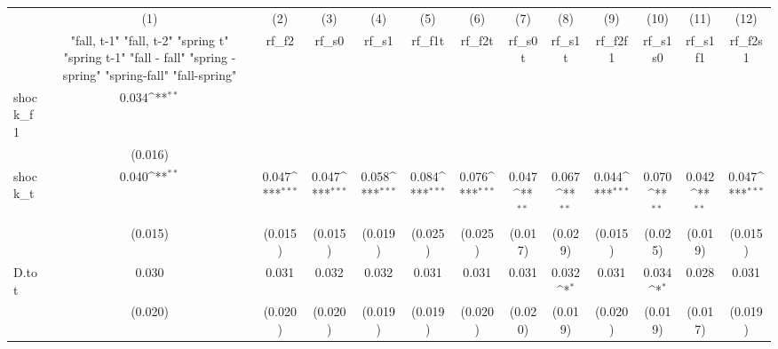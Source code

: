 {
\def\sym#1{\ifmmode^{#1}\else\(^{#1}\)\fi}
\begin{tabular}{l*{12}{c}}
\toprule
            &\multicolumn{1}{c}{(1)}&\multicolumn{1}{c}{(2)}&\multicolumn{1}{c}{(3)}&\multicolumn{1}{c}{(4)}&\multicolumn{1}{c}{(5)}&\multicolumn{1}{c}{(6)}&\multicolumn{1}{c}{(7)}&\multicolumn{1}{c}{(8)}&\multicolumn{1}{c}{(9)}&\multicolumn{1}{c}{(10)}&\multicolumn{1}{c}{(11)}&\multicolumn{1}{c}{(12)}\\
            &\multicolumn{1}{c}{  "fall, t-1" "fall, t-2" "spring t" "spring t-1"  "fall - fall" "spring - spring" "spring-fall" "fall-spring" }&\multicolumn{1}{c}{rf\_f2}&\multicolumn{1}{c}{rf\_s0}&\multicolumn{1}{c}{rf\_s1}&\multicolumn{1}{c}{rf\_f1t}&\multicolumn{1}{c}{rf\_f2t}&\multicolumn{1}{c}{rf\_s0t}&\multicolumn{1}{c}{rf\_s1t}&\multicolumn{1}{c}{rf\_f2f1}&\multicolumn{1}{c}{rf\_s1s0}&\multicolumn{1}{c}{rf\_s1f1}&\multicolumn{1}{c}{rf\_f2s1}\\
\midrule
shock\_f1    &       0.034\sym{**} &                     &                     &                     &                     &                     &                     &                     &                     &                     &                     &                     \\
            &     (0.016)         &                     &                     &                     &                     &                     &                     &                     &                     &                     &                     &                     \\
\addlinespace
shock\_t     &       0.040\sym{**} &       0.047\sym{***}&       0.047\sym{***}&       0.058\sym{***}&       0.084\sym{***}&       0.076\sym{***}&       0.047\sym{**} &       0.067\sym{**} &       0.044\sym{***}&       0.070\sym{**} &       0.042\sym{**} &       0.047\sym{***}\\
            &     (0.015)         &     (0.015)         &     (0.015)         &     (0.019)         &     (0.025)         &     (0.025)         &     (0.017)         &     (0.029)         &     (0.015)         &     (0.025)         &     (0.019)         &     (0.015)         \\
\addlinespace
D.tot       &       0.030         &       0.031         &       0.032         &       0.032         &       0.031         &       0.031         &       0.031         &       0.032\sym{*}  &       0.031         &       0.034\sym{*}  &       0.028         &       0.031         \\
            &     (0.020)         &     (0.020)         &     (0.020)         &     (0.019)         &     (0.019)         &     (0.020)         &     (0.020)         &     (0.019)         &     (0.020)         &     (0.019)         &     (0.017)         &     (0.019)         \\

\end{tabular}}
